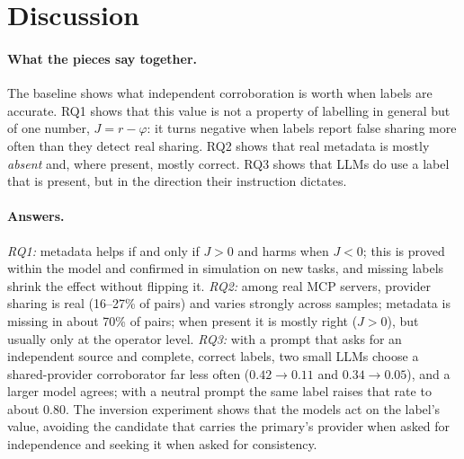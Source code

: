\section{Discussion}\label{sec:discussion}

\paragraph{What the pieces say together.} The baseline shows what independent corroboration is worth when labels are accurate. RQ1 shows that this value is not a property of labelling in general but of one number, $J=r-\varphi$: it turns negative when labels report false sharing more often than they detect real sharing. RQ2 shows that real metadata is mostly \emph{absent} and, where present, mostly correct. RQ3 shows that LLMs do use a label that is present, but in the direction their instruction dictates.

\paragraph{Answers.}
\emph{RQ1:} metadata helps if and only if $J>0$ and harms when $J<0$; this is proved within the model and confirmed in simulation on new tasks, and missing labels shrink the effect without flipping it. \emph{RQ2:} among real MCP servers, provider sharing is real (16--27\% of pairs) and varies strongly across samples; metadata is missing in about 70\% of pairs; when present it is mostly right ($J>0$), but usually only at the operator level. \emph{RQ3:} with a prompt that asks for an independent source and complete, correct labels, two small LLMs choose a shared-provider corroborator far less often ($0.42\to0.11$ and $0.34\to0.05$), and a larger model agrees; with a neutral prompt the same label raises that rate to about $0.80$. The inversion experiment shows that the models act on the label's value, avoiding the candidate that carries the primary's provider when asked for independence and seeking it when asked for consistency.

